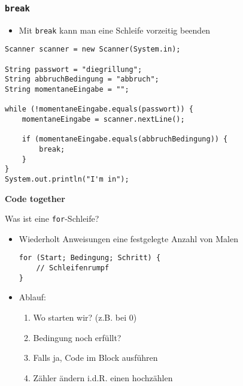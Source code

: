 \documentclass{../../presentation}
\begin{document}
\begin{frame}[fragile]
  \frametitle{\texttt{break}}

  \begin{itemize}
    \item Mit \texttt{break} kann man eine Schleife vorzeitig beenden
  \end{itemize}

  \begin{verbatim}
Scanner scanner = new Scanner(System.in);

String passwort = "diegrillung";
String abbruchBedingung = "abbruch";
String momentaneEingabe = "";

while (!momentaneEingabe.equals(passwort)) {
    momentaneEingabe = scanner.nextLine();

    if (momentaneEingabe.equals(abbruchBedingung)) {
        break;
    }
}
System.out.println("I'm in");
\end{verbatim}
\end{frame}


\begin{frame}[plain]
  \centering
  {\Huge\bfseries{Code together}}
\end{frame}



\begin{frame}[fragile]{Was ist eine \texttt{for}-Schleife?}

  \begin{itemize}
    \item Wiederholt Anweisungen eine festgelegte Anzahl von Malen
          \begin{verbatim}
for (Start; Bedingung; Schritt) {
    // Schleifenrumpf
}
\end{verbatim}
    \item Ablauf:
          \begin{enumerate}
            \item Wo starten wir? (z.B. bei 0)
            \item Bedingung noch erfüllt?
            \item Falls ja, Code im Block ausführen
            \item Zähler ändern i.d.R. einen hochzählen
          \end{enumerate}
  \end{itemize}
\end{frame}
\end{document}
